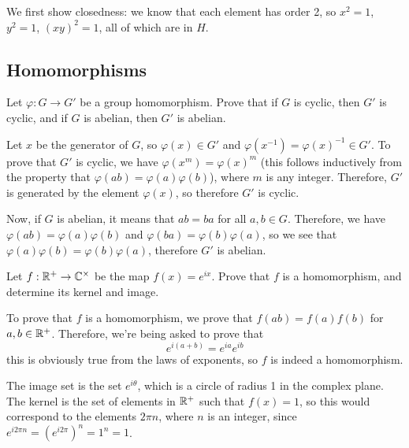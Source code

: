 \documentclass[10pt]{article}
\begin{document}
\begin{solution}
	We first show closedness: we know that each element has order 2, so \( x^2 = 1 \), 
	\( y^2 = 1 \), \( (xy)^2 = 1 \), all of which are in \( H \).  

\end{solution}

\subsection{Homomorphisms}

\begin{problem}
	Let \( \varphi: G \to G' \) be a group homomorphism. 
	Prove that if \( G \) is cyclic, 
	then \( G' \) is cyclic, and if \( G \) is abelian, then \( G' \) is 
	abelian. 
\end{problem}

\begin{solution}
	Let \( x \) be the generator of \( G \), so \( \varphi(x) \in G' \) and 
	\( \varphi(x^{-1}) = \varphi(x)^{-1} \in G' \). To prove that 
	\( G' \) is cyclic, we have \( \varphi(x^{m}) = \varphi(x)^{m} \) (this 
	follows inductively from the property that 
	\( \varphi(ab) = \varphi(a) \varphi(b) \)), where \( m \) 
	is any integer. Therefore, \( G' \) is generated by the element \( \varphi(x) \), 
	so therefore \( G' \) is cyclic. 

	Now, if \( G \) is abelian, it means that \( ab = ba \) for all \( a, b \in G \). 
	Therefore, we have \( \varphi(ab) = \varphi(a) \varphi(b) \) and 
	\( \varphi(ba) = \varphi(b) \varphi(a) \), so we see that \( \varphi(a) \varphi(b)
	= \varphi(b) \varphi(a)\), therefore \( G' \) is abelian. 
\end{solution}

\begin{problem}
	Let \( f: \mathbb R^{+} \to \mathbb C^{\times} \) be the map \( f(x) = e^{ix} \). Prove that 
	\( f \) is a homomorphism, and determine its kernel and image. 
\end{problem}

\begin{solution}
	To prove that \( f \) is a homomorphism, we prove that \( f(ab) = f(a) f(b) \) 
	for \( a, b \in \mathbb R^{+} \). Therefore, we're being asked to prove that
	\[
	e^{i(a + b)} = e^{ia} e^{ib}
	\] 
	this is obviously true from the laws of exponents, so \( f \) is indeed a 
	homomorphism. 

	The image set is the set \( e^{i \theta} \), which is a circle of radius 1 in the 
	complex plane. The kernel is the set of elements in \( \mathbb R^{+} \) such that 
	\( f(x) = 1 \), so this would correspond to the elements \( 2\pi n \), where 
	\( n  \) is an integer, since \( e^{i2 \pi n} = (e^{i2\pi})^{n} = 1^{n} = 1 \). 
\end{solution}
\end{document}
